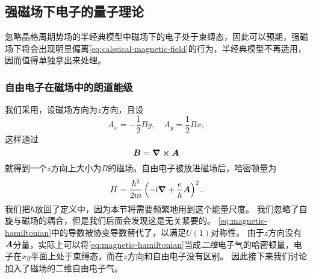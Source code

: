 \subsection{强磁场下电子的量子理论}\label{sec:quantum-magnetic-field}

忽略晶格周期势场的半经典模型中磁场下的电子处于束缚态，因此可以预期，强磁场下将会出现明显偏离\eqref{eq:calssical-magnetic-field}的行为，半经典模型不再适用，因而值得单独拿出来处理。

\subsubsection{自由电子在磁场中的朗道能级}

我们采用，设磁场方向为$z$方向，且设
\begin{equation}
    A_x = - \frac{1}{2} B y, \quad A_y = \frac{1}{2} B x,
\end{equation}
这样通过
\[
    \vb*{B} = \curl{\vb*{A}}
\]
就得到一个$z$方向上大小为$B$的磁场。自由电子被放进磁场后，哈密顿量为
\begin{equation}
    {H} = \frac{\hbar^2}{2m} \left( - \mathrm{i} \grad + \frac{e}{\hbar} \vb*{A} \right)^2.
    \label{eq:magnetic-hamiltonian}
\end{equation}
我们把$\hbar$放回了定义中，因为本节将需要频繁地用到这个能量尺度。
我们忽略了自旋与磁场的耦合，但是我们后面会发现这是无关紧要的。
\eqref{eq:magnetic-hamiltonian}中的导数被协变导数替代了，以满足$U(1)$对称性。
由于$z$方向没有$\vb*{A}$分量，实际上可以将\eqref{eq:magnetic-hamiltonian}当成\emph{二维}电子气的哈密顿量，电子在$xy$平面上处于束缚态，而在$z$方向和自由电子没有区别。
因此接下来我们讨论加入了磁场的二维自由电子气。

